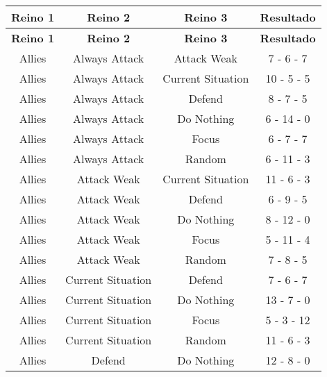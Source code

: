 \documentclass[11pt]{article}
\begin{document}
            \begin{longtable}{|c|c|c|c|}
                \hline \textbf{Reino 1}  & \textbf{Reino 2} & \textbf{Reino 3}  & \textbf{Resultado} \\ 
                \endfirsthead
                \hline \textbf{Reino 1}  & \textbf{Reino 2} & \textbf{Reino 3}  & \textbf{Resultado} \\
                \endhead
                \hline      Allies       &   Always Attack   &    Attack Weak    &  7 - 6 - 7  \\
                \hline      Allies       &   Always Attack   & Current Situation & 10 - 5 - 5  \\
                \hline      Allies       &   Always Attack   &      Defend       &  8 - 7 - 5  \\
                \hline      Allies       &   Always Attack   &    Do Nothing     & 6 - 14 - 0  \\
                \hline      Allies       &   Always Attack   &       Focus       &  6 - 7 - 7  \\
                \hline      Allies       &   Always Attack   &      Random       & 6 - 11 - 3  \\
                \hline      Allies       &    Attack Weak    & Current Situation & 11 - 6 - 3  \\
                \hline      Allies       &    Attack Weak    &      Defend       &  6 - 9 - 5  \\
                \hline      Allies       &    Attack Weak    &    Do Nothing     & 8 - 12 - 0  \\
                \hline      Allies       &    Attack Weak    &       Focus       & 5 - 11 - 4  \\
                \hline      Allies       &    Attack Weak    &      Random       &  7 - 8 - 5  \\
                \hline      Allies       & Current Situation &      Defend       &  7 - 6 - 7  \\
                \hline      Allies       & Current Situation &    Do Nothing     & 13 - 7 - 0  \\
                \hline      Allies       & Current Situation &       Focus       & 5 - 3 - 12  \\
                \hline      Allies       & Current Situation &      Random       & 11 - 6 - 3  \\
                \hline      Allies       &      Defend       &    Do Nothing     & 12 - 8 - 0  \\

\end{longtable}
\end{document}
